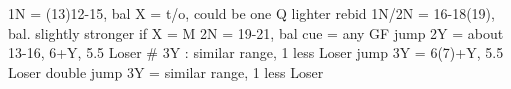 1N = (13)12-15, bal
X = t/o, could be one Q lighter  
    rebid 1N/2N = 16-18(19), bal. slightly stronger if X = M
2N = 19-21, bal
cue = any GF
jump 2Y = about 13-16, 6+Y, 5.5 Loser  # 3Y : similar range, 1 less Loser
jump 3Y = 6(7)+Y, 5.5 Loser
double jump 3Y = similar range, 1 less Loser
